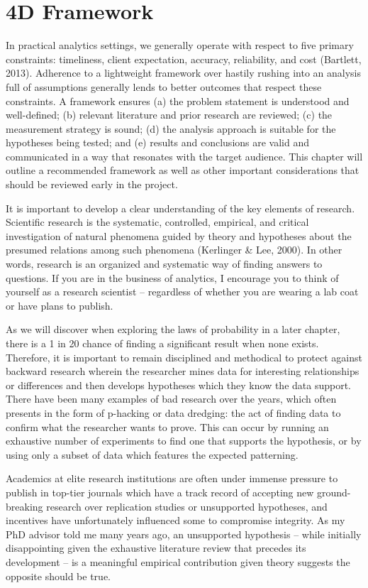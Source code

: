 \documentclass[]{book}
\begin{document}
\hypertarget{d-framework}{%
\section{4D Framework}\label{d-framework}}

In practical analytics settings, we generally operate with respect to five primary constraints: timeliness, client expectation, accuracy, reliability, and cost (Bartlett, 2013). Adherence to a lightweight framework over hastily rushing into an analysis full of assumptions generally lends to better outcomes that respect these constraints. A framework ensures (a) the problem statement is understood and well-defined; (b) relevant literature and prior research are reviewed; (c) the measurement strategy is sound; (d) the analysis approach is suitable for the hypotheses being tested; and (e) results and conclusions are valid and communicated in a way that resonates with the target audience. This chapter will outline a recommended framework as well as other important considerations that should be reviewed early in the project.

It is important to develop a clear understanding of the key elements of research. Scientific research is the systematic, controlled, empirical, and critical investigation of natural phenomena guided by theory and hypotheses about the presumed relations among such phenomena (Kerlinger \& Lee, 2000). In other words, research is an organized and systematic way of finding answers to questions. If you are in the business of analytics, I encourage you to think of yourself as a research scientist -- regardless of whether you are wearing a lab coat or have plans to publish.

As we will discover when exploring the laws of probability in a later chapter, there is a 1 in 20 chance of finding a significant result when none exists. Therefore, it is important to remain disciplined and methodical to protect against backward research wherein the researcher mines data for interesting relationships or differences and then develops hypotheses which they know the data support. There have been many examples of bad research over the years, which often presents in the form of p-hacking or data dredging: the act of finding data to confirm what the researcher wants to prove. This can occur by running an exhaustive number of experiments to find one that supports the hypothesis, or by using only a subset of data which features the expected patterning.

Academics at elite research institutions are often under immense pressure to publish in top-tier journals which have a track record of accepting new ground-breaking research over replication studies or unsupported hypotheses, and incentives have unfortunately influenced some to compromise integrity. As my PhD advisor told me many years ago, an unsupported hypothesis -- while initially disappointing given the exhaustive literature review that precedes its development -- is a meaningful empirical contribution given theory suggests the opposite should be true.
\end{document}
